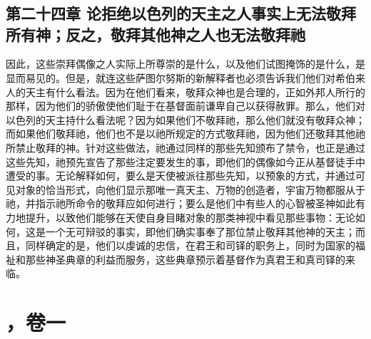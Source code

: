 

\section{}


\subsection{第二十四章 论拒绝以色列的天主之人事实上无法敬拜所有神；反之，敬拜其他神之人也无法敬拜祂}

因此，这些崇拜偶像之人实际上所尊崇的是什么，以及他们试图掩饰的是什么，是显而易见的。但是，就连这些萨图尔努斯的新解释者也必须告诉我们他们对希伯来人的天主有什么看法。因为在他们看来，敬拜众神也是合理的，正如外邦人所行的那样，因为他们的骄傲使他们耻于在基督面前谦卑自己以获得赦罪。那么，他们对以色列的天主持什么看法呢？因为如果他们不敬拜祂，那么他们就没有敬拜众神；而如果他们敬拜祂，他们也不是以祂所规定的方式敬拜祂，因为他们还敬拜其他祂所禁止敬拜的神。针对这些做法，祂通过同样的那些先知颁布了禁令，也正是通过这些先知，祂预先宣告了那些注定要发生的事，即他们的偶像如今正从基督徒手中遭受的事。无论解释如何，要么是天使被派往那些先知，以预象的方式，并通过可见对象的恰当形式，向他们显示那唯一真天主、万物的创造者，宇宙万物都服从于祂，并指示祂所命令的敬拜应如何进行；要么是他们中有些人的心智被圣神如此有力地提升，以致他们能够在天使自身目睹对象的那类神视中看见那些事物：无论如何，这是一个无可辩驳的事实，即他们确实事奉了那位禁止敬拜其他神的天主；而且，同样确定的是，他们以虔诚的忠信，在君王和司铎的职务上，同时为国家的福祉和那些神圣典章的利益而服务，这些典章预示着基督作为真君王和真司铎的来临。\par



\section{，卷一}

